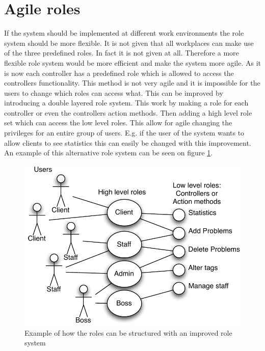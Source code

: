 \section{Agile roles}
\label{sec:agile_roles}
If the system should be implemented at different work environments the role system should be more flexible. 
It is not given that all workplaces can make use of the three predefined roles. 
In fact it is not given at all. 
Therefore a more flexible role system would be more efficient and make the system more agile. 
As it is now each controller has a predefined role which is allowed to access the controllers functionality. 
This method is not very agile and it is impossible for the users to change which roles can access what. 
This can be improved by introducing a double layered role system.  
This work by making a role for each controller or even the controllers action methods. 
Then adding a high level role set which can access the low level roles. 
This allow for agile changing the privileges for an entire group of users. 
E.g. if the user of the system wants to allow clients to see statistics this can easily be changed with this improvement. An example of this alternative role system can be seen on figure \ref{fig:improved_role_system}.


\begin{figure}
\begin{center}
\includegraphics[scale=1]{input/epilogue/future_work/improved_role_system.pdf}
\caption{Example of how the roles can be structured with an improved role system}
\label{fig:improved_role_system}
\end{center}
\end{figure}
